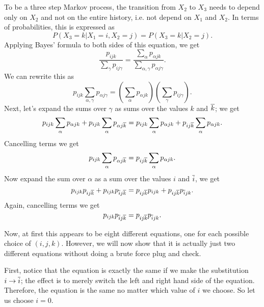 To be a three step Markov process, the transition from \(X_2\) to \(X_3\) needs to depend only on \(X_2\) and
not on the entire history, i.e. not depend on \(X_1\) and \(X_2\). In terms of probabilities, this is
expressed as 
\begin{equation}
P(X_3 = k | X_1 = i, X_2 = j) = P(X_3 = k | X_2 = j).
\end{equation}
Applying Bayes' formula to both sides of this equation, we get
\begin{equation}
\frac{p_{ijk}}{\sum_\gamma p_{ij\gamma}} 
= \frac{\sum_\alpha p_{\alpha jk}} {\sum_{\alpha, \gamma} p_{\alpha j\gamma} }.
\end{equation}
We can rewrite this as 
\begin{equation}
p_{ijk} \sum_{\alpha, \gamma} p_{\alpha j\gamma} =
     \left(\sum_\alpha p_{\alpha jk}\right) \left( \sum_\gamma p_{ij\gamma} \right).
\end{equation}
Next, let's expand the sums over \(\gamma\) as sums over the values \(k\) and \(\overline{k}\); we get
\begin{equation}
p_{ijk}\sum_\alpha p_{\alpha jk} + p_{ijk} \sum_\alpha p_{\alpha j\overline{k}} =
p_{ijk} \sum_\alpha p_{\alpha jk} + p_{ij\overline{k}} \sum_\alpha p_{\alpha jk}.
\end{equation}
Cancelling terms we get
\begin{equation}
p_{ijk} \sum_\alpha p_{\alpha j\overline{k}} = p_{ij\overline{k}} \sum_\alpha p_{\alpha jk}.
\end{equation}
Now expand the sum over \(\alpha\) as a sum over the values \(i\) and \(\overline{i}\), we get
\begin{equation}
p_{ijk} p_{ij\overline{k}} + p_{ijk} p_{\overline{i}j\overline{k}} = p_{ij\overline{k}} p_{ijk} + p_{ij\overline{k}} p_{\overline{i}jk}.
\end{equation}
Again, cancelling terms we get
\begin{equation}
p_{ijk} p_{\overline{i}j\overline{k}} = p_{ij\overline{k}} p_{\overline{i}jk}.
\end{equation}

Now, at first this appears to be eight different equations, one for each possible choice of \((i, j, k)\). 
However, we will now show that it is actually just two different equations without doing a brute force
plug and check.

First, notice that the equation is exactly the same if we make the substitution \(i \to \overline{i}\); the effect
is to merely switch the left and right hand side of the equation. Therefore, the equation is the same no matter
which value of \(i\) we choose. So let us choose \(i = 0\).


